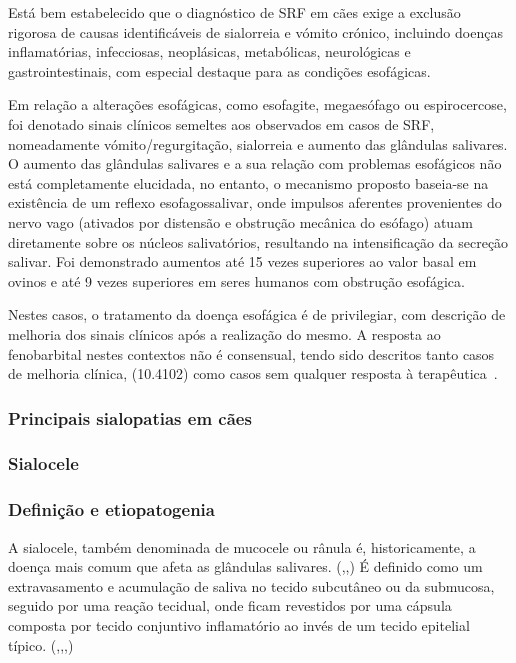 Está bem estabelecido que o diagnóstico de SRF em cães exige a exclusão rigorosa de causas identificáveis de sialorreia e vómito crónico, incluindo doenças inflamatórias, infecciosas, neoplásicas, metabólicas, neurológicas e gastrointestinais, com especial destaque para as condições esofágicas. 


Em relação a alterações esofágicas, como esofagite, megaesófago ou espirocercose, foi denotado sinais clínicos semel\cite{Han2016}tes aos observados em casos de SRF, nomeadamente vómito/regurgitação, sialorreia e aumento das glândulas salivares. O aumento das glândulas salivares e a sua relação com problemas esofágicos não está completamente elucidada, no entanto, o mecanismo proposto baseia-se na existência de um reflexo esofagossalivar, onde impulsos aferentes provenientes do nervo vago (ativados por distensão e obstrução mecânica do esófago) atuam diretamente sobre os núcleos salivatórios, resultando na intensificação da secreção salivar. Foi demonstrado aumentos até 15 vezes superiores ao valor basal em ovinos e até 9 vezes superiores em seres humanos com obstrução esofágica.


Nestes casos, o tratamento da doença esofágica é de privilegiar, com descrição de melhoria dos sinais clínicos após a realização do mesmo. A resposta ao fenobarbital nestes contextos não é consensual, tendo sido descritos tanto casos de melhoria clínica, (10.4102) como casos sem qualquer resposta à terapêutica~\cite{Walton-Clark2022,gibbon_phenobarbital-responsive_german_2004}.

\subsubsection{Principais sialopatias em cães}
\subsubsection{Sialocele}
\subsubsection{Definição e etiopatogenia}

A sialocele, também denominada de mucocele ou rânula é, historicamente, a doença  mais comum que afeta as glândulas salivares. (\cite{deLaPuerta2020},\cite{Cinti2021},\cite{Olimpo2023}) É definido como um extravasamento e acumulação de saliva no tecido subcutâneo ou da submucosa, seguido por uma reação tecidual, onde ficam revestidos por uma cápsula composta por tecido conjuntivo inflamatório ao invés de um tecido epitelial típico. (\cite{Zadeh2025},\cite{rfeu},\cite{Bae2024},\cite{sa_})


